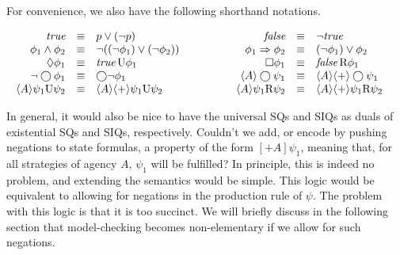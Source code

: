 \documentclass{llncs}
\newcommand{\true}{\mbox{\em true}}
\newcommand{\false}{\mbox{\em false}}
\newcommand{\pfrr}{\Box}
\newcommand{\until}{\textrm{U}} %
\newcommand{\rmrel}{\textrm{R}} %
\newcommand{\pevt}{\Diamond}
\newcommand{\nxt}{\bigcirc}
\begin{document}
For convenience, we also have the following shorthand notations.
\begin{center}
$\begin{array}{rclcrcl}
\true
& \equiv & p\vee(\neg p) 
& \hspace*{10mm} & %
\false
& \equiv & \neg\true \\
\phi_1\wedge \phi_2
& \equiv & \neg((\neg\phi_1)\vee(\neg\phi_2)) 
& \hspace*{10mm} & %
\phi_1\Rightarrow \phi_2
& \equiv & (\neg \phi_1)\vee \phi_2 \\
\pevt \phi_1
& \equiv & \true\,\until \phi_1 
& \hspace*{10mm} & %
\pfrr \phi_1
& \equiv & \false\,\rmrel \phi_1 \\
\neg\nxt \phi_1
& \equiv & \nxt\neg\phi_1 
& \hspace*{10mm} & %
\; \langle A\rangle \nxt\psi_1 
& \equiv & \langle A\rangle \langle+\rangle\nxt\psi_1 \\
\; \langle A\rangle \psi_1\until\psi_2
& \equiv & \langle A\rangle\langle+\rangle \psi_1\until\psi_2 
& \hspace*{10mm} & %
\; \langle A\rangle \psi_1\rmrel\psi_2  
& \equiv & \langle A\rangle \langle+\rangle\psi_1 \rmrel\psi_2 \\
\end{array}
$
\end{center} 
In general, it would also be nice to have the universal SQs and 
SIQs as duals of existential SQs and SIQs, respectively. 
Couldn't we add, or encode by pushing negations to state formulas, 
a property of the form $[+A]\psi_1$, meaning that, for all strategies of agency $A$,  $\psi_1$ will be fulfilled? 
In principle, this is indeed no problem, and extending the semantics would be simple.
This logic would be equivalent to allowing for negations in the production rule of $\psi$.
The problem with this logic is that it is too succinct.
We will briefly discuss in the following section that model-checking becomes non-elementary if we allow for such negations.
\end{document}
